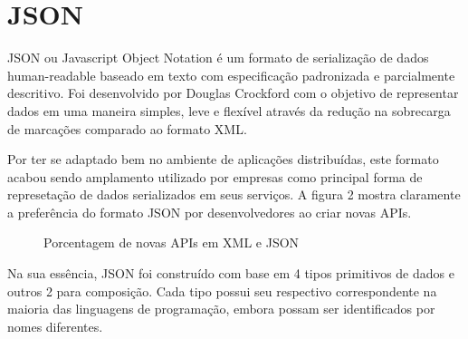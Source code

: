 \section{JSON}

JSON ou Javascript Object Notation é um formato de serialização de dados human-readable baseado em texto com especificação padronizada e parcialmente descritivo. Foi desenvolvido por Douglas Crockford com o objetivo de representar dados em uma maneira simples, leve e flexível através da redução na sobrecarga de marcações comparado ao formato XML.

Por ter se adaptado bem no ambiente de aplicações distribuídas, este formato acabou sendo amplamento utilizado por empresas como principal forma de represetação de dados serializados em seus serviços. A figura 2 mostra claramente a preferência do formato JSON por desenvolvedores ao criar novas APIs. \cite{Duvander2013}

\begin{figure}[h]
  \centering
  \caption{Porcentagem de novas APIs em XML e JSON}
\end{figure}

Na sua essência, JSON foi construído com base em 4 tipos primitivos de dados e outros 2 para composição. Cada tipo possui seu respectivo correspondente na maioria das linguagens de programação, embora possam ser identificados por nomes diferentes. \cite{Droettboom2015}

